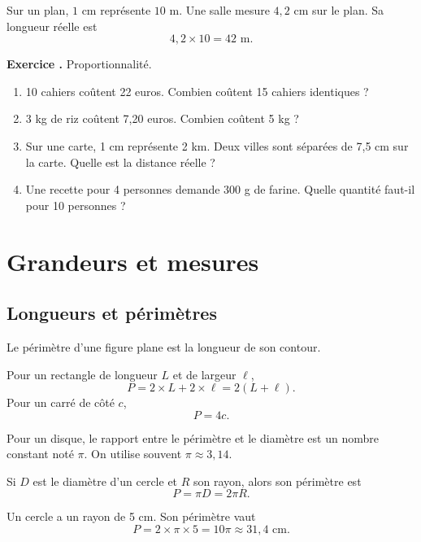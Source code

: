 \documentclass[11pt,a4paper]{article}
\newcounter{exo}
\newcommand{\exercice}[1]{\refstepcounter{exo}\begin{exobox}\textbf{Exercice \theexo.} #1\end{exobox}}
\begin{document}
\begin{exemplebox}
Sur un plan, \(1\) cm représente \(10\) m. Une salle mesure \(4,2\) cm sur le plan. Sa longueur réelle est
\[
4,2\times10=42\text{ m}.
\]
\end{exemplebox}

\exercice{Proportionnalité.
\begin{enumerate}[label=\alph*)]
\item 10 cahiers coûtent 22 euros. Combien coûtent 15 cahiers identiques ?
\item 3 kg de riz coûtent 7,20 euros. Combien coûtent 5 kg ?
\item Sur une carte, 1 cm représente 2 km. Deux villes sont séparées de 7,5 cm sur la carte. Quelle est la distance réelle ?
\item Une recette pour 4 personnes demande 300 g de farine. Quelle quantité faut-il pour 10 personnes ?
\end{enumerate}}

\section{Grandeurs et mesures}

\subsection{Longueurs et périmètres}

\begin{definitionbox}
Le périmètre d'une figure plane est la longueur de son contour.
\end{definitionbox}

\begin{proprbox}
Pour un rectangle de longueur \(L\) et de largeur \(\ell\),
\[
P=2\times L+2\times\ell=2(L+\ell).
\]
Pour un carré de côté \(c\),
\[
P=4c.
\]
\end{proprbox}

\begin{definitionbox}
Pour un disque, le rapport entre le périmètre et le diamètre est un nombre constant noté \(\pi\). On utilise souvent \(\pi\approx3,14\).
\end{definitionbox}

\begin{proprbox}
Si \(D\) est le diamètre d'un cercle et \(R\) son rayon, alors son périmètre est
\[
P=\pi D=2\pi R.
\]
\end{proprbox}

\begin{exemplebox}
Un cercle a un rayon de 5 cm. Son périmètre vaut
\[
P=2\times\pi\times5=10\pi\approx31,4\text{ cm}.
\]
\end{exemplebox}
\end{document}
